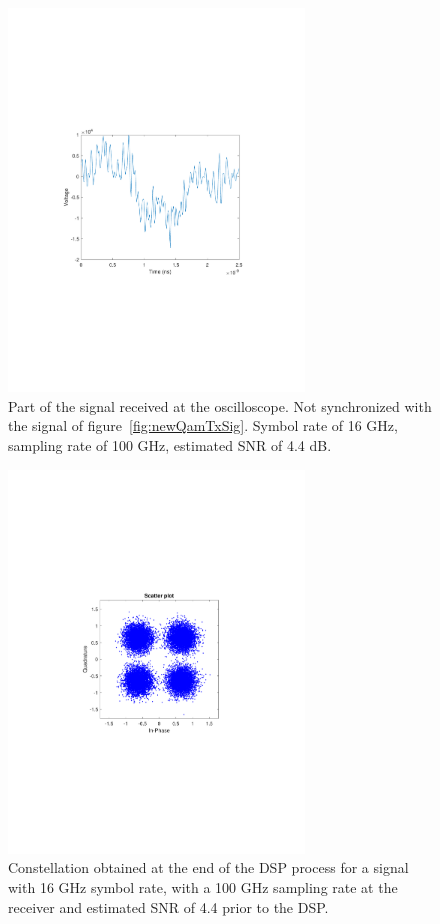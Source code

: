 \begin{refsection}
\begin{figure}[H]
	\centering
	\includegraphics[clip, trim=4cm 8cm 4cm 8cm, width=0.7\textwidth]{./sdf/m_qam_system/figures/experimentalRxSnr4Sr16.pdf}
	\caption{Part of the signal received at the oscilloscope. Not synchronized with the signal of figure~\ref{fig:newQamTxSig}. Symbol rate of 16 GHz, sampling rate of 100 GHz, estimated SNR of 4.4 dB.}
	\label{fig:newQamRxSig}
\end{figure}


\begin{figure}[H]
	\centering
	\includegraphics[clip, trim=4cm 8cm 4cm 8cm, width=0.7\textwidth]{./sdf/m_qam_system/figures/experimentalConstSnr4Sr16.pdf}
	\caption{Constellation obtained at the end of the DSP process for a signal with 16 GHz symbol rate, with a 100 GHz sampling rate at the receiver and estimated SNR of 4.4 prior to the DSP.}
	\label{fig:newExpConst}
\end{figure}


\end{refsection}
